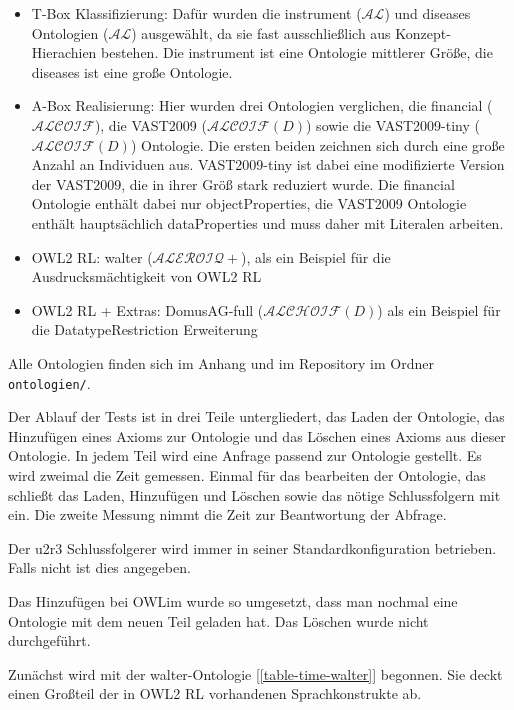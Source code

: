 \begin{itemize}
  \item T-Box Klassifizierung: Dafür wurden die instrument ($\mathcal{AL}$) und diseases Ontologien ($\mathcal{AL}$) ausgewählt, da sie fast ausschließlich aus Konzept-Hierachien bestehen. Die instrument ist eine Ontologie mittlerer Größe, die diseases ist eine große Ontologie.
  \item A-Box Realisierung: Hier wurden drei Ontologien verglichen, die financial ($\mathcal{ALCOIF}$), die VAST2009 ($\mathcal{ALCOIF}(D)$) sowie die VAST2009-tiny ($\mathcal{ALCOIF}(D)$) Ontologie. Die ersten beiden zeichnen sich durch eine große Anzahl an Individuen aus. VAST2009-tiny ist dabei eine modifizierte Version der VAST2009, die in ihrer Größ stark reduziert wurde. Die financial Ontologie enthält dabei nur objectProperties, die VAST2009 Ontologie enthält hauptsächlich dataProperties und muss daher mit Literalen arbeiten.
  \item OWL2 RL: walter ($\mathcal{ALEROIQ}+$), als ein Beispiel für die Ausdrucksmächtigkeit von OWL2 RL
  \item OWL2 RL + Extras: DomusAG-full ($\mathcal{ALCHOIF}(D)$) als ein Beispiel für die DatatypeRestriction Erweiterung
\end{itemize}

Alle Ontologien finden sich im Anhang und im Repository im Ordner \texttt{ontologien/}.

Der Ablauf der Tests ist in drei Teile untergliedert, das Laden der Ontologie, das Hinzufügen eines Axioms zur Ontologie und das Löschen eines Axioms aus dieser Ontologie. In jedem Teil wird eine Anfrage passend zur Ontologie gestellt. Es wird zweimal die Zeit gemessen. Einmal für das bearbeiten der Ontologie, das schließt das Laden, Hinzufügen und Löschen sowie das nötige Schlussfolgern mit ein. Die zweite Messung nimmt die Zeit zur Beantwortung der Abfrage.

Der u2r3 Schlussfolgerer wird immer in seiner Standardkonfiguration betrieben. Falls nicht ist dies angegeben.

Das Hinzufügen bei OWLim wurde so umgesetzt, dass man nochmal eine Ontologie mit dem neuen Teil geladen hat. Das Löschen wurde nicht durchgeführt.

Zunächst wird mit der walter-Ontologie [\ref{table-time-walter}] begonnen. Sie deckt einen Großteil der in OWL2 RL vorhandenen Sprachkonstrukte ab.

